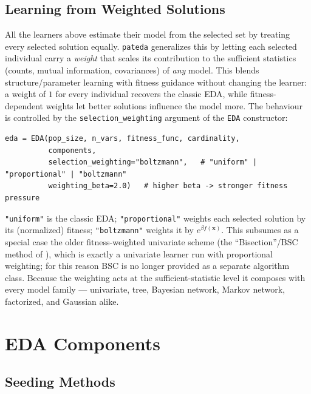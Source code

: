 \documentclass[a4paper,11pt]{article}
\begin{document}
\subsection{Learning from Weighted Solutions}
\label{sec:weighted_learning}

All the learners above estimate their model from the selected set by treating
every selected solution equally. \texttt{pateda} generalizes this by letting each
selected individual carry a \emph{weight} that scales its contribution to the
sufficient statistics (counts, mutual information, covariances) of \emph{any}
model. This blends structure/parameter learning with fitness guidance without
changing the learner: a weight of $1$ for every individual recovers the classic
EDA, while fitness-dependent weights let better solutions influence the model
more. The behaviour is controlled by the \texttt{selection\_weighting} argument of
the \texttt{EDA} constructor:

\begin{lstlisting}
eda = EDA(pop_size, n_vars, fitness_func, cardinality,
          components,
          selection_weighting="boltzmann",   # "uniform" | "proportional" | "boltzmann"
          weighting_beta=2.0)   # higher beta -> stronger fitness pressure
\end{lstlisting}

\texttt{"uniform"} is the classic EDA; \texttt{"proportional"} weights each
selected solution by its (normalized) fitness; \texttt{"boltzmann"} weights it by
$e^{\beta f(\mathbf{x})}$. This subsumes as a special case the older
fitness-weighted univariate scheme (the ``Bisection''/BSC method of
\citet{Inza_et_al:2000}), which is exactly a univariate learner run with
proportional weighting; for this reason BSC is no longer provided as a separate
algorithm class. Because the weighting acts at the sufficient-statistic level it
composes with every model family --- univariate, tree, Bayesian network, Markov
network, factorized, and Gaussian alike.

\section{EDA Components}
\label{sec:components}

\subsection{Seeding Methods}
\end{document}

